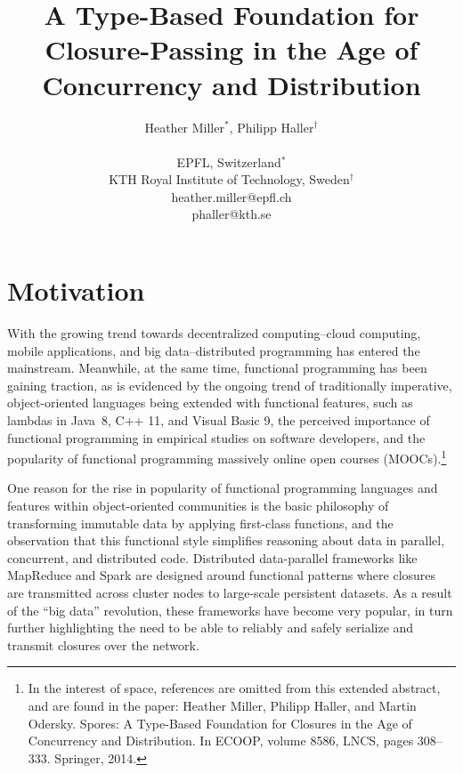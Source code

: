 \documentclass[english]{lni}
\author{
	Heather Miller$^*$, Philipp Haller$^\dagger$ \\
	\\
	EPFL, Switzerland$^*$ \\
	KTH Royal Institute of Technology, Sweden$^\dagger$ \\
	heather.miller@epfl.ch \\
	phaller@kth.se
}
\title{A Type-Based Foundation for Closure-Passing in the Age of Concurrency and Distribution}
\begin{document}
\maketitle


\vspace{-10mm}
\section{Motivation}
\vspace{-4mm}
With the growing trend towards decentralized computing--cloud computing,
mobile applications, and big data--distributed programming has entered the
mainstream. Meanwhile, at the same time, functional programming has been
gaining traction, as is evidenced by the ongoing
trend of traditionally imperative, object-oriented languages being extended
with functional features, such as lambdas in \mbox{Java 8}, C++ 11, and Visual
Basic 9, the perceived importance of functional programming in empirical
studies on software developers, and the popularity of functional programming
massively online open courses (MOOCs).\footnote{In the interest
of space, references are omitted from this extended abstract, and are found
in the paper: Heather Miller, Philipp Haller, and Martin Odersky. Spores: A
Type-Based Foundation for Closures in the Age of Concurrency and Distribution.
In ECOOP, volume 8586, LNCS, pages 308--333. Springer, 2014.}

One reason for the rise in popularity of functional programming languages and
features within object-oriented communities is the basic philosophy of
transforming immutable data by applying first-class functions, and the
observation that this functional style simplifies reasoning about data in
parallel, concurrent, and distributed code. Distributed data-parallel
frameworks like MapReduce and Spark are designed
around functional patterns where closures are transmitted across cluster nodes
to large-scale persistent datasets. As a result of the ``big data''
revolution, these frameworks have become very popular, in turn further
highlighting the need to be able to reliably and safely serialize and transmit
closures over the network.
\end{document}
